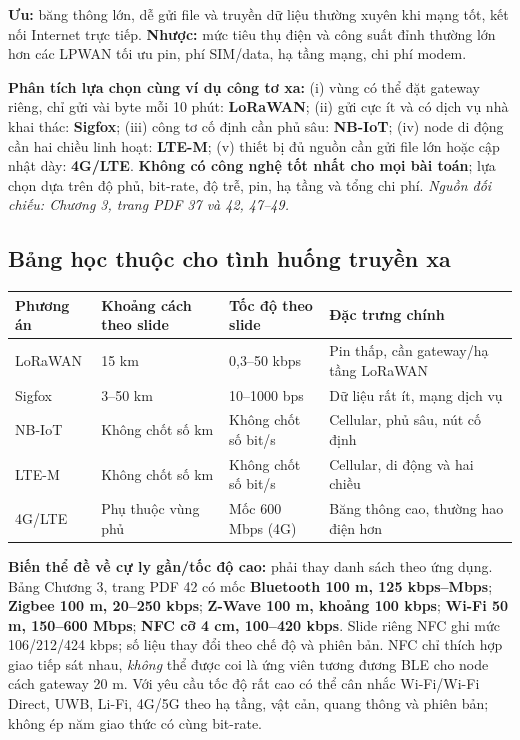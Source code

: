 \documentclass[12pt,a4paper]{article}
\newcommand{\nguon}[1]{{\small\itshape\color{navy}Nguồn đối chiếu: #1.}}
\begin{document}
\textbf{Ưu:} băng thông lớn, dễ gửi file và truyền dữ liệu thường xuyên khi mạng tốt, kết nối Internet trực tiếp. \textbf{Nhược:} mức tiêu thụ điện và công suất đỉnh thường lớn hơn các LPWAN tối ưu pin, phí SIM/data, hạ tầng mạng, chi phí modem.

\textbf{Phân tích lựa chọn cùng ví dụ công tơ xa:} (i) vùng có thể đặt gateway riêng, chỉ gửi vài byte mỗi 10 phút: \textbf{LoRaWAN}; (ii) gửi cực ít và có dịch vụ nhà khai thác: \textbf{Sigfox}; (iii) công tơ cố định cần phủ sâu: \textbf{NB-IoT}; (iv) node di động cần hai chiều linh hoạt: \textbf{LTE-M}; (v) thiết bị đủ nguồn cần gửi file lớn hoặc cập nhật dày: \textbf{4G/LTE}. \textbf{Không có công nghệ tốt nhất cho mọi bài toán}; lựa chọn dựa trên độ phủ, bit-rate, độ trễ, pin, hạ tầng và tổng chi phí. \nguon{Chương 3, trang PDF 37 và 42, 47--49}

\subsection*{Bảng học thuộc cho tình huống truyền xa}
\begin{center}\footnotesize
\begin{tabularx}{\linewidth}{p{2cm}p{2.2cm}p{2.5cm}X}
\toprule
Phương án & Khoảng cách theo slide & Tốc độ theo slide & Đặc trưng chính\\
\midrule
LoRaWAN & 15 km & 0,3--50 kbps & Pin thấp, cần gateway/hạ tầng LoRaWAN\\
Sigfox & 3--50 km & 10--1000 bps & Dữ liệu rất ít, mạng dịch vụ\\
NB-IoT & Không chốt số km & Không chốt số bit/s & Cellular, phủ sâu, nút cố định\\
LTE-M & Không chốt số km & Không chốt số bit/s & Cellular, di động và hai chiều\\
4G/LTE & Phụ thuộc vùng phủ & Mốc 600 Mbps (4G) & Băng thông cao, thường hao điện hơn\\
\bottomrule
\end{tabularx}
\end{center}

\begin{luuy}
\textbf{Biến thể đề về cự ly gần/tốc độ cao:} phải thay danh sách theo ứng dụng. Bảng Chương 3, trang PDF 42 có mốc \textbf{Bluetooth 100 m, 125 kbps--Mbps}; \textbf{Zigbee 100 m, 20--250 kbps}; \textbf{Z-Wave 100 m, khoảng 100 kbps}; \textbf{Wi-Fi 50 m, 150--600 Mbps}; \textbf{NFC cỡ 4 cm, 100--420 kbps}. Slide riêng NFC ghi mức 106/212/424 kbps; số liệu thay đổi theo chế độ và phiên bản. NFC chỉ thích hợp giao tiếp sát nhau, \emph{không} thể được coi là ứng viên tương đương BLE cho node cách gateway 20 m. Với yêu cầu tốc độ rất cao có thể cân nhắc Wi-Fi/Wi-Fi Direct, UWB, Li-Fi, 4G/5G theo hạ tầng, vật cản, quang thông và phiên bản; không ép năm giao thức có cùng bit-rate.
\end{luuy}
\end{document}
